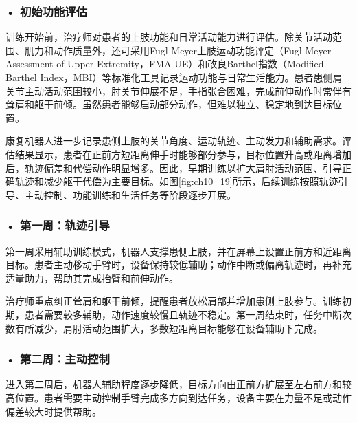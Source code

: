 \subsubsection*{\textbf{• 初始功能评估}}

训练开始前，治疗师对患者的上肢功能和日常活动能力进行评估。除关节活动范围、肌力和动作质量外，还可采用Fugl-Meyer上肢运动功能评定（Fugl-Meyer Assessment of Upper Extremity，FMA-UE）和改良Barthel指数（Modified Barthel Index，MBI）等标准化工具记录运动功能与日常生活能力。患者患侧肩关节主动活动范围较小，肘关节伸展不足，手指张合困难，完成前伸动作时常伴有耸肩和躯干前倾。虽然患者能够启动部分动作，但难以独立、稳定地到达目标位置。

康复机器人进一步记录患侧上肢的关节角度、运动轨迹、主动发力和辅助需求。评估结果显示，患者在正前方短距离伸手时能够部分参与，目标位置升高或距离增加后，轨迹偏差和代偿动作明显增多。因此，早期训练以扩大肩肘活动范围、引导正确轨迹和减少躯干代偿为主要目标。如图\ref{fig:ch10_19}所示，后续训练按照轨迹引导、主动控制、功能训练和生活任务等阶段逐步开展。

\par
\noindent\begin{minipage}{\textwidth}
\centering
{}
\label{fig:ch10_19}
\end{minipage}
\par

\subsubsection*{\textbf{• 第一周：轨迹引导}}

第一周采用辅助训练模式，机器人支撑患侧上肢，并在屏幕上设置正前方和近距离目标。患者主动移动手臂时，设备保持较低辅助；动作中断或偏离轨迹时，再补充适量助力，帮助其完成抬臂和前伸动作。

治疗师重点纠正耸肩和躯干前倾，提醒患者放松肩部并增加患侧上肢参与。训练初期，患者需要较多辅助，动作速度较慢且轨迹不稳定。第一周结束时，任务中断次数有所减少，肩肘活动范围扩大，多数短距离目标能够在设备辅助下完成。

\subsubsection*{\textbf{• 第二周：主动控制}}

进入第二周后，机器人辅助程度逐步降低，目标方向由正前方扩展至左右前方和较高位置。患者需要主动控制手臂完成多方向到达任务，设备主要在力量不足或动作偏差较大时提供帮助。

